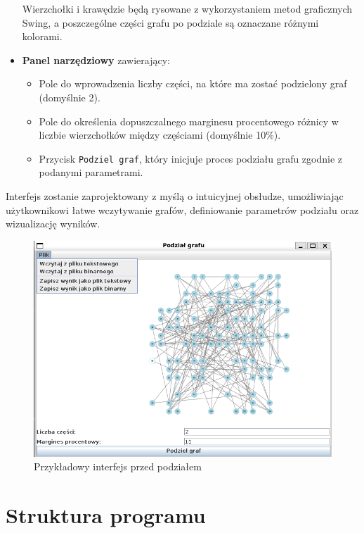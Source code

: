 \documentclass{article}
\begin{document}
\begin{itemize}
        Wierzchołki i krawędzie będą rysowane z wykorzystaniem metod graficznych Swing, a poszczególne części grafu po podziale są oznaczane różnymi kolorami.
        \item \textbf{Panel narzędziowy} zawierający:
        \begin{itemize}
            \item Pole do wprowadzenia liczby części, na które ma zostać podzielony graf (domyślnie 2).
            \item Pole do określenia dopuszczalnego marginesu procentowego różnicy w liczbie wierzchołków między częściami (domyślnie 10\%).
            \item Przycisk \texttt{Podziel graf}, który inicjuje proces podziału grafu zgodnie z podanymi parametrami.
        \end{itemize}
    \end{itemize}
    
    Interfejs zostanie zaprojektowany z myślą o intuicyjnej obsłudze, umożliwiając użytkownikowi łatwe wczytywanie grafów, definiowanie parametrów podziału oraz wizualizację wyników.
    
    \begin{figure}[H]
        \centering
        \includegraphics[width=0.9\linewidth]{img/interfejs.png}
        \caption{Przykładowy interfejs przed podziałem}
        \label{fig:interfejs}
    \end{figure}



\section{Struktura programu}
\end{document}
